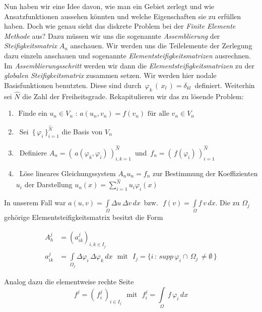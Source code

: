 Nun haben wir eine Idee davon, wie man ein Gebiet zerlegt und wie Ansatzfunktionen aussehen könnten und welche Eigenschaften sie zu erfüllen haben. Doch wie genau sieht das diskrete Problem bei der \textit{Finite Elemente Methode} aus? Dazu müssen wir uns die sogenannte \textit{Assemblierung} der \textit{Steifigkeitsmatrix} $A_n$ anschauen. Wir werden uns die Teilelemente der Zerlegung dazu einzeln anschauen und sogenannte \textit{Elementsteifigkeitsmatrizen} ausrechnen. Im \textit{Assemblierungsschritt} werden wir dann die  \textit{Elementsteifigkeitsmatrizen} zu der \textit{globalen Steifigkeitsmatrix} zusammen setzen.
Wir werden hier nodale Basisfunktionen benutzten. Diese sind durch $\, \varphi_k \, ( \, x_l \, ) = \delta_{kl} \,$ definiert. Weiterhin sei $\hat{N}$ die Zahl der Freiheitsgrade. Rekapitulieren wir das zu lösende Problem:

\begin{framed}
\begin{enumerate}
\item $
\text{ Finde ein } u_n \in V_n \text{ : } a(u_n,v_n) = f(v_n) \text{ für alle } v_n \in V_n
$
\item ~Sei $\, \{ \, \varphi_i \, \}_{i=1}^{\hat{N}}$ die Basis  von $V_n$
\item ~Definiere $A_n=( \, a(\varphi_k,\varphi_i) \, )_{i,k=1}^{\hat{N}} \, $ und $ \, f_n=( \, f(\varphi_i) \, )_{i=1}^{\hat{N}}$
\item ~Löse lineares Gleichungssystem $A_n u_n=f_n$ zur Bestimmung der Koeffizienten $u_i$ der Darstellung $u_n(x)=\sum_{i=1}^{\hat{N}} u_i \varphi_i(x)$
\end{enumerate}
\end{framed}

In unserem Fall war $a(u,v)=\int\limits_{\Omega} \Delta u \, \Delta v \, dx \, $ bzw. $\, \, f(v)=\int\limits_{\Omega} f \, v \, dx$. Die zu $\Omega_j$ gehörige Elementsteifigkeitsmatrix besitzt die Form

\begin{equation} \label{eq:element}
\begin{aligned}
A_h^j &= (a_{ik}^j)_{i,k \in I_j} \\
a_{ik}^j &= \int\limits_{\Omega_j} \Delta \varphi_i \, \Delta \varphi_k \, dx \, \, \text{ mit } \, \, 
I_j =\{ i \, : \, supp \, \varphi_i \cap \, \Omega_j \, \neq \emptyset \, \}
\end{aligned}
\end{equation}

Analog dazu die elementweise rechte Seite
\begin{equation*}
f^j = (\, f_i^j \, )_{i \in I_j} \, \, \text{ mit } \, \, f_i^j = \int\limits_{\Omega} \, f \, \varphi_i \, dx 
\end{equation*}


